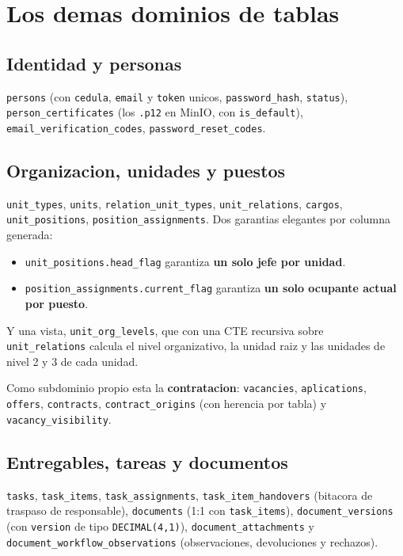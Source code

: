 \documentclass[11pt,a4paper,oneside]{report}
\newcommand{\rt}[1]{\texttt{#1}}
\begin{document}
\section{Los demas dominios de tablas}

\subsection{Identidad y personas}
\rt{persons} (con \rt{cedula}, \rt{email} y \rt{token} unicos, \rt{password\_hash},
\rt{status}), \rt{person\_certificates} (los \rt{.p12} en MinIO, con \rt{is\_default}),
\rt{email\_verification\_codes}, \rt{password\_reset\_codes}.

\subsection{Organizacion, unidades y puestos}
\rt{unit\_types}, \rt{units}, \rt{relation\_unit\_types}, \rt{unit\_relations},
\rt{cargos}, \rt{unit\_positions}, \rt{position\_assignments}. Dos garantias elegantes por
columna generada:

\begin{itemize}[leftmargin=1.4em]
  \item \rt{unit\_positions.head\_flag} garantiza \textbf{un solo jefe por unidad}.
  \item \rt{position\_assignments.current\_flag} garantiza \textbf{un solo ocupante actual por
        puesto}.
\end{itemize}

Y una vista, \rt{unit\_org\_levels}, que con una CTE recursiva sobre \rt{unit\_relations}
calcula el nivel organizativo, la unidad raiz y las unidades de nivel 2 y 3 de cada unidad.

Como subdominio propio esta la \textbf{contratacion}: \rt{vacancies}, \rt{aplications},
\rt{offers}, \rt{contracts}, \rt{contract\_origins} (con herencia por tabla) y
\rt{vacancy\_visibility}.

\subsection{Entregables, tareas y documentos}
\rt{tasks}, \rt{task\_items}, \rt{task\_assignments}, \rt{task\_item\_handovers} (bitacora de
traspaso de responsable), \rt{documents} (1:1 con \rt{task\_items}), \rt{document\_versions}
(con \rt{version} de tipo \rt{DECIMAL(4,1)}), \rt{document\_attachments} y
\rt{document\_workflow\_observations} (observaciones, devoluciones y rechazos).
\end{document}

